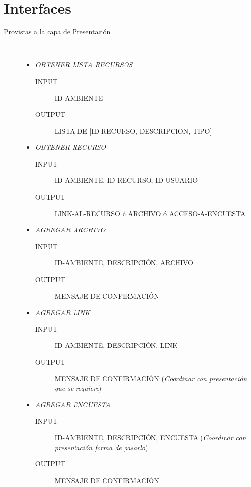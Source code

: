 \documentclass{article}
\begin{document}
\section{Interfaces}
	\begin{description}
		\item[Provistas a la capa de Presentaci\'on ] \
		\renewcommand{\labelitemi}{\ding{105}} 
		\begin{itemize}
			\item \emph{OBTENER LISTA RECURSOS}
			\begin{description}
				\item[INPUT] ID-AMBIENTE
				\item[OUTPUT] LISTA-DE [ID-RECURSO, DESCRIPCION, TIPO]\\
			\end{description}
			\item \emph{OBTENER RECURSO}
			\begin{description}
				\item[INPUT] ID-AMBIENTE, ID-RECURSO, ID-USUARIO
				\item[OUTPUT] LINK-AL-RECURSO \'o ARCHIVO \'o ACCESO-A-ENCUESTA\\
			\end{description}
			\item \emph{AGREGAR ARCHIVO}
			\begin{description}
				\item[INPUT] ID-AMBIENTE, DESCRIPCI\'ON, ARCHIVO
				\item[OUTPUT] MENSAJE DE CONFIRMACI\'ON\\
			\end{description}
			\item \emph{AGREGAR LINK}
			\begin{description}
				\item[INPUT] ID-AMBIENTE, DESCRIPCI\'ON, LINK
				\item[OUTPUT] MENSAJE DE CONFIRMACI\'ON (\emph{Coordinar con presentaci\'on que se requiere})\\
			\end{description}
			\item \emph{AGREGAR ENCUESTA}
			\begin{description}
				\item[INPUT] ID-AMBIENTE, DESCRIPCI\'ON, ENCUESTA (\emph{Coordinar con presentaci\'on forma de pasarlo})
				\item[OUTPUT] MENSAJE DE CONFIRMACI\'ON\\
			\end{description}

\end{itemize}
\end{description}
\end{document}
